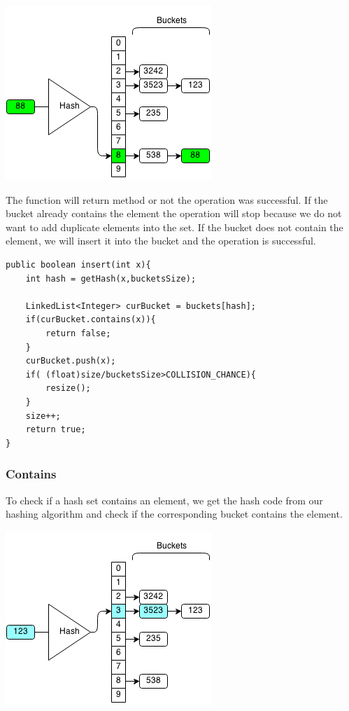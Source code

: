 \documentclass[11pt,oneside]{book}
\makeatletter
\def\maxwidth#1{\ifdim\Gin@nat@width>#1 #1\else\Gin@nat@width\fi}
\makeatother
\begin{document}
\includegraphics[width=\maxwidth{\textwidth}]{hashsetinsert.png}

The function will return method or not the operation was successful. If the bucket already contains the element the operation will stop because we do not want to add duplicate elements into the set. If the bucket does not contain the element, we will insert it into the bucket and the operation is successful.

\begin{lstlisting}
public boolean insert(int x){
    int hash = getHash(x,bucketsSize);
        
    LinkedList<Integer> curBucket = buckets[hash];
    if(curBucket.contains(x)){
        return false;
    }
    curBucket.push(x);
    if( (float)size/bucketsSize>COLLISION_CHANCE){
        resize();
    }
    size++;
    return true;
}
\end{lstlisting}

\subsubsection{Contains}

To check if a hash set contains an element, we get the hash code from our hashing algorithm and check if the corresponding bucket contains the element.

\includegraphics[width=\maxwidth{\textwidth}]{hashsetcontains.png}
\end{document}
